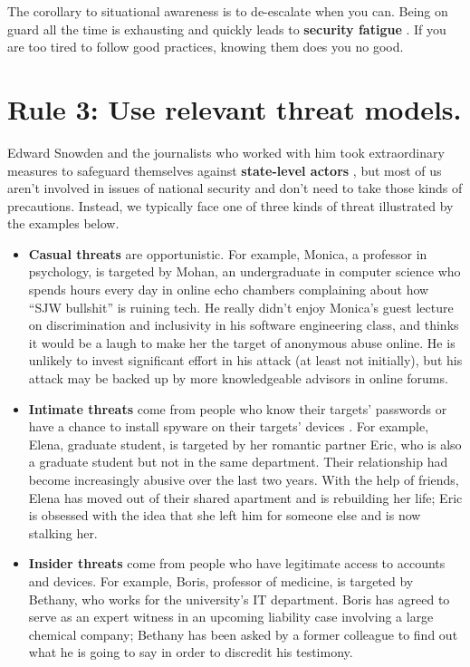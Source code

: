 \documentclass[10pt,letterpaper]{article}
\newcommand{\rulemajor}[1]{\section*{#1}}
\begin{document}
The corollary to situational awareness is to de-escalate when you can.
Being on guard all the time is exhausting
and quickly leads to \textbf{security fatigue} \cite{Stan2016}.
If you are too tired to follow good practices,
knowing them does you no good.

\rulemajor{Rule 3: Use relevant threat models.}

Edward Snowden and the journalists who worked with him took extraordinary measures
to safeguard themselves against \textbf{state-level actors} \cite{Snow2019},
but most of us aren't involved in issues of national security
and don't need to take those kinds of precautions.
Instead,
we typically face one of three kinds of threat illustrated by the examples below.

\begin{itemize}

\item
  \textbf{Casual threats} are opportunistic.
  For example,
  Monica, a professor in psychology, is targeted by Mohan,
  an undergraduate in computer science
  who spends hours every day in online echo chambers complaining about how ``SJW bullshit'' is ruining tech.
  He really didn't enjoy Monica's guest lecture on discrimination and inclusivity in his software engineering class,
  and thinks it would be a laugh to make her the target of anonymous abuse online.
  He is unlikely to invest significant effort in his attack (at least not initially),
  but his attack may be backed up by more knowledgeable advisors in online forums.

\item
  \textbf{Intimate threats} come from people who know their targets' passwords
  or have a chance to install spyware on their targets' devices \cite{Leit2019}.
  For example,
  Elena, graduate student,
  is targeted by her romantic partner Eric,
  who is also a graduate student but not in the same department.
  Their relationship had become increasingly abusive over the last two years.
  With the help of friends,
  Elena has moved out of their shared apartment and is rebuilding her life;
  Eric is obsessed with the idea that she left him for someone else and is now stalking her.

\item
  \textbf{Insider threats} come from people who have legitimate access to accounts and devices.
  For example,
  Boris, professor of medicine,
  is targeted by Bethany, who works for the university's IT department.
  Boris has agreed to serve as an expert witness in an upcoming liability case involving a large chemical company;
  Bethany has been asked by a former colleague to find out what he is going to say in order to discredit his testimony.

\end{itemize}
\end{document}
